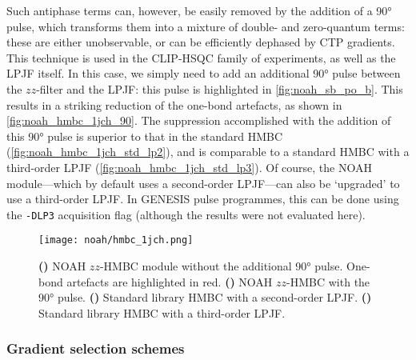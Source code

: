 Such antiphase terms can, however, be easily removed by the addition of a \carbon{} \ang{90} pulse, which transforms them into a mixture of double- and zero-quantum terms: these are either unobservable, or can be efficiently dephased by CTP gradients.
This technique is used in the CLIP-HSQC family of experiments\autocite{Enthart2008JMR,Gyongyosi2021AC}, as well as the LPJF itself.
In this case, we simply need to add an additional \carbon{} \ang{90} pulse between the $zz$-filter and the LPJF: this pulse is highlighted in \cref{fig:noah_sb_po_b}.
This results in a striking reduction of the one-bond artefacts, as shown in \cref{fig:noah_hmbc_1jch_90}.
The suppression accomplished with the addition of this \ang{90} pulse is superior to that in the standard HMBC (\cref{fig:noah_hmbc_1jch_std_lp2}), and is comparable to a standard HMBC with a third-order LPJF (\cref{fig:noah_hmbc_1jch_std_lp3}).
Of course, the NOAH module---which by default uses a second-order LPJF---can also be `upgraded' to use a third-order LPJF.
In GENESIS pulse programmes, this can be done using the \texttt{-DLP3} acquisition flag (although the results were not evaluated here).

\begin{figure}[!ht]
    \centering
    \texttt{[image: noah/hmbc\_1jch.png]}%
    {\label{fig:noah_hmbc_1jch_no90}}%
    {\label{fig:noah_hmbc_1jch_90}}%
    {\label{fig:noah_hmbc_1jch_std_lp2}}%
    {\label{fig:noah_hmbc_1jch_std_lp3}}%
    \caption[Suppression of one-bond artefacts in NOAH HMBC spectra]{
        \textbf{()} NOAH $zz$-HMBC module without the additional \ang{90} pulse.
        One-bond artefacts are highlighted in red.
        \textbf{()} NOAH $zz$-HMBC with the \ang{90} pulse.
        \textbf{()} Standard library HMBC with a second-order LPJF.
        \textbf{()} Standard library HMBC with a third-order LPJF.
    }
    \label{fig:noah_hmbc_1jch}
\end{figure}


\subsubsection{Gradient selection schemes}

